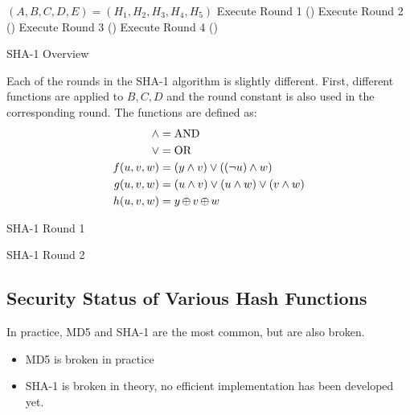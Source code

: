 \begin{algorithm}[H]
  \DontPrintSemicolon{}

  \BlankLine{}

  $(A, B, C, D, E) = (H_{1}, H_{2}, H_{3}, H_{4}, H_{5})$\;
  Execute Round 1 () \;
  Execute Round 2 () \;
  Execute Round 3 () \;
  Execute Round 4 () \;
  \caption{SHA-1 Overview}
  \label{algo:SHA_1_Overview}
\end{algorithm}

Each of the rounds in the SHA-1 algorithm is slightly different.
First, different functions are applied to $B, C, D$ and the round constant is also used in the corresponding round.
The functions are defined as:
\begin{align*}
  \wedge &= \text{AND} \\
  \vee &= \text{OR} \\
  f(u, v, w) &= (y \wedge v) \vee ((\neg u) \wedge w) \\
  g(u, v, w) &= (u \wedge v) \vee (u \wedge w) \vee (v \wedge w) \\
  h(u, v, w) &= y \operatorname{\oplus} v \operatorname{\oplus} w
\end{align*}

\begin{algorithm}[H]
  \DontPrintSemicolon{}
  \caption{SHA-1 Round 1}
  \label{algo:SHA_1_Round_1}
\end{algorithm}

\begin{algorithm}[H]
  \DontPrintSemicolon{}
  \caption{SHA-1 Round 2}
  \label{algo:SHA_1_Round_2}
\end{algorithm}


\subsection{Security Status of Various Hash Functions}\label{subsec:Hash_Functions_Security_Status}
In practice, MD5 and SHA-1 are the most common, but are also broken.
\begin{itemize}[noitemsep]
\item MD5 is broken in practice
\item SHA-1 is broken in theory, no efficient implementation has been developed yet.
\end{itemize}

